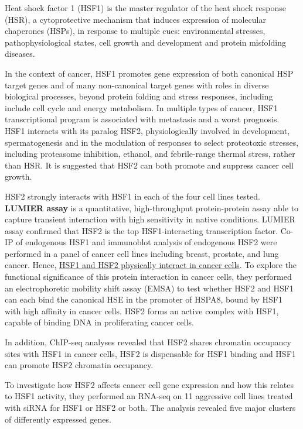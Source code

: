 Heat shock factor 1 (HSF1) is the master regulator of the heat shock response (HSR), a cytoprotective mechanism that induces expression of
molecular chaperones (HSPs), in response to multiple cues: environmental stresses, pathophysiological states, cell growth and development and
protein misfolding diseases.

In the context of cancer, HSF1 promotes gene expression of both canonical HSP target genes and of many non-canonical target genes with roles in diverse biological processes, beyond protein folding and stress responses, including include cell cycle and energy metabolism. In multiple types of cancer, HSF1 transcriptional program is associated with metastasis and a worst prognosis. HSF1 interacts with its paralog HSF2, physiologically involved in development, spermatogenesis and in the modulation of responses to select proteotoxic stresses, including proteasome inhibition, ethanol, and febrile-range thermal stress, rather than HSR. It is suggested that HSF2 can both promote and suppress cancer cell growth.

HSF2 strongly interacts with HSF1 in each of the four cell lines tested. \textbf{LUMIER assay} is a quantitative, high-throughput protein-protein assay able to capture transient interaction with high sensitivity in native conditions. LUMIER assay confirmed that HSF2 is the top HSF1-interacting transcription factor. Co-IP of endogenous HSF1 and immunoblot analysis of endogenous HSF2 were performed in a panel of cancer cell lines including breast, prostate, and lung cancer. Hence, \underline{HSF1 and HSF2 physically interact in cancer cells}. To explore the functional significance of this protein interaction in cancer cells, they performed an electrophoretic mobility shift assay (EMSA) to test whether HSF2 and HSF1 can each bind the canonical HSE in the promoter of HSPA8, bound by HSF1 with high affinity in cancer cells. HSF2 forms an active complex with HSF1, capable of binding DNA in proliferating cancer cells.

In addition, ChIP-seq analyses revealed that HSF2 shares chromatin occupancy sites with HSF1 in cancer cells, HSF2 is dispensable for HSF1 binding and HSF1 can promote HSF2 chromatin occupancy.

To investigate how HSF2 affects cancer cell gene expression and how this relates to HSF1 activity, they performed an RNA-seq on 11 aggressive
cell lines treated with siRNA for HSF1 or HSF2 or both. The analysis revealed five major clusters of differently expressed genes.

